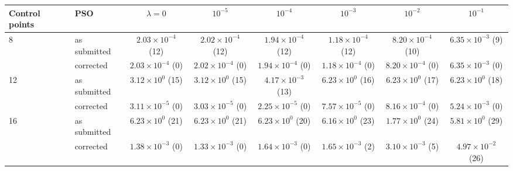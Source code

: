 \begin{tabular}{llcccccc}
\toprule
Control points & PSO & $\lambda=0$ & $10^{-5}$ & $10^{-4}$ & $10^{-3}$ & $10^{-2}$ & $10^{-1}$\\
\midrule
8 & as submitted & $2.03\times10^{-4}$ (12) & $2.02\times10^{-4}$ (12) & $1.94\times10^{-4}$ (12) & $1.18\times10^{-4}$ (12) & $8.20\times10^{-4}$ (10) & $6.35\times10^{-3}$ (9)\\
 & corrected & $2.03\times10^{-4}$ (0) & $2.02\times10^{-4}$ (0) & $1.94\times10^{-4}$ (0) & $1.18\times10^{-4}$ (0) & $8.20\times10^{-4}$ (0) & $6.35\times10^{-3}$ (0)\\
12 & as submitted & $3.12\times10^{0}$ (15) & $3.12\times10^{0}$ (15) & $4.17\times10^{-3}$ (13) & $6.23\times10^{0}$ (16) & $6.23\times10^{0}$ (17) & $6.23\times10^{0}$ (18)\\
 & corrected & $3.11\times10^{-5}$ (0) & $3.03\times10^{-5}$ (0) & $2.25\times10^{-5}$ (0) & $7.57\times10^{-5}$ (0) & $8.16\times10^{-4}$ (0) & $5.24\times10^{-3}$ (0)\\
16 & as submitted & $6.23\times10^{0}$ (21) & $6.23\times10^{0}$ (21) & $6.23\times10^{0}$ (20) & $6.16\times10^{0}$ (23) & $1.77\times10^{0}$ (24) & $5.81\times10^{0}$ (29)\\
 & corrected & $1.38\times10^{-3}$ (0) & $1.33\times10^{-3}$ (0) & $1.64\times10^{-3}$ (0) & $1.65\times10^{-3}$ (2) & $3.10\times10^{-3}$ (5) & $4.97\times10^{-2}$ (26)\\
\bottomrule
\end{tabular}